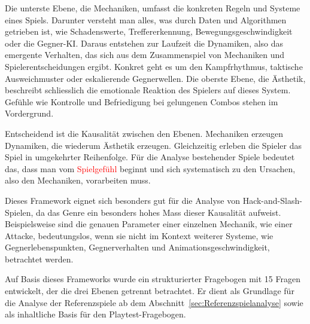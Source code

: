 \documentclass[../Main.tex]{subfiles}
\begin{document}
Die unterste Ebene, die Mechaniken, umfasst die konkreten Regeln und Systeme eines Spiels. Darunter versteht man alles, was durch Daten und Algorithmen getrieben ist, wie Schadenswerte, Treffererkennung, Bewegungsgeschwindigkeit oder die Gegner-KI. Daraus entstehen zur Laufzeit die Dynamiken, also das emergente Verhalten, das sich aus dem Zusammenspiel von Mechaniken und Spielerentscheidungen ergibt. Konkret geht es um den Kampfrhythmus, taktische Ausweichmuster oder eskalierende Gegnerwellen. Die oberste Ebene, die Ästhetik, beschreibt schliesslich die emotionale Reaktion des Spielers auf dieses System. Gefühle wie Kontrolle und Befriedigung bei gelungenen Combos stehen im Vordergrund.

Entscheidend ist die Kausalität zwischen den Ebenen. Mechaniken erzeugen Dynamiken, die wiederum Ästhetik erzeugen. Gleichzeitig erleben die Spieler das Spiel in umgekehrter Reihenfolge. Für die Analyse bestehender Spiele bedeutet das, dass man vom \textcolor{red}{Spielgefühl} beginnt und sich systematisch zu den Ursachen, also den Mechaniken, vorarbeiten muss.

Dieses Framework eignet sich besonders gut für die Analyse von Hack-and-Slash-Spielen, da das Genre ein besonders hohes Mass dieser Kausalität aufweist. Beispielsweise sind die genauen Parameter einer einzelnen Mechanik, wie einer Attacke, bedeutungslos, wenn sie nicht im Kontext weiterer Systeme, wie Gegnerlebenspunkten, Gegnerverhalten und Animationsgeschwindigkeit, betrachtet werden.\autocite{hunicke2004mda}

Auf Basis dieses Frameworks wurde ein strukturierter Fragebogen mit 15 Fragen entwickelt, der die drei Ebenen getrennt betrachtet. Er dient als Grundlage für die Analyse der Referenzspiele ab dem Abschnitt~\ref{sec:Referenzspielanalyse} sowie als inhaltliche Basis für den Playtest-Fragebogen.
\end{document}
